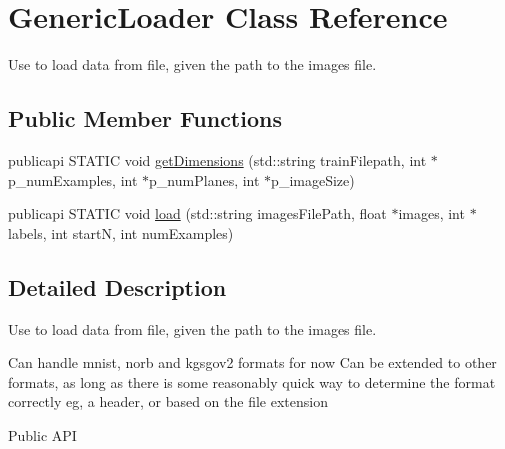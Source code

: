 \hypertarget{classGenericLoader}{\section{Generic\-Loader Class Reference}
\label{classGenericLoader}
}


Use to load data from file, given the path to the images file.  


\subsection*{Public Member Functions}
\begin{DoxyCompactItemize}
\item 
publicapi S\-T\-A\-T\-I\-C void \hyperlink{classGenericLoader_aedf07f7f05373a7347d5e1d17ccc58c3}{get\-Dimensions} (std\-::string train\-Filepath, int $\ast$p\-\_\-num\-Examples, int $\ast$p\-\_\-num\-Planes, int $\ast$p\-\_\-image\-Size)
\item 
publicapi S\-T\-A\-T\-I\-C void \hyperlink{classGenericLoader_ae628e58147a15c3aa83a3f50facdbdcb}{load} (std\-::string images\-File\-Path, float $\ast$images, int $\ast$labels, int start\-N, int num\-Examples)
\end{DoxyCompactItemize}


\subsection{Detailed Description}
Use to load data from file, given the path to the images file. 

Can handle mnist, norb and kgsgov2 formats for now Can be extended to other formats, as long as there is some reasonably quick way to determine the format correctly eg, a header, or based on the file extension \begin{DoxyParagraph}{Public A\-P\-I}

\end{DoxyParagraph}


